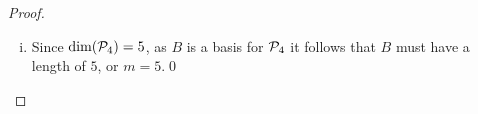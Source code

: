 \begin{proof}
\begin{enumerate}[(i)]
        Moreover, since $\dim(\P_4)=5$ and $B$ has a length of 5, from Theorem 2.39 Section 2C LADR it follows that $B$ is a basis for $\P_4$.
        Therefore, it is possible that no polynomial in $B$ has degree 2.\qed
        \item Since $\dim(\P_4)=5$, as $B$ is a basis for $\P_4$ it follows that $B$ must have a length of $5$, or $m=5$.\qed
    \end{enumerate}
    \renewcommand{\qedsymbol}{}
\end{proof}